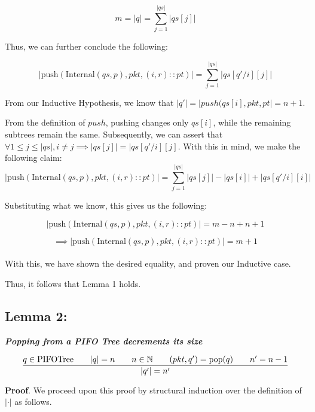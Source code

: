 \documentclass{article}
\begin{document}
$$m = |q| = \sum_{j=1}^{|qs|} |qs[j]|$$

\noindent Thus, we can further conclude the following:

$$|\text{push}(\text{Internal}(qs, p), pkt, (i, r) :: pt)| = \sum_{j=1}^{|qs|} |qs[q'/i][j]|$$

\noindent From our Inductive Hypothesis, we know that $|q'| = |push(qs[i], pkt, pt| = n+1$.\newline

\noindent From the definition of $push$, pushing changes only $qs[i]$, while the remaining subtrees remain the same. Subsequently, we can assert that $\forall 
1 \leq j \leq |qs|, i \neq j \implies |qs[j]| = |qs[q'/i][j]$. With this in mind, we make the following claim:\\[-15pt]

$$|\text{push}(\text{Internal}(qs, p), pkt, (i, r) :: pt)| = \sum_{j=1}^{|qs|} |qs[j]| - |qs[i]| + |qs[q'/i][i]|$$

\noindent Substituting what we know, this gives us the following:

$$|\text{push}(\text{Internal}(qs, p), pkt, (i, r) :: pt)| = m - n + n + 1$$

$$\implies |\text{push}(\text{Internal}(qs, p), pkt, (i, r) :: pt)| = m + 1$$\\[-15pt]

\noindent With this, we have shown the desired equality, and proven our Inductive case.\newline

\noindent Thus, it follows that Lemma 1 holds.\newline

\subsection{Lemma 2:}

\noindent \textbf{\textit{Popping from a PIFO Tree decrements its size}}

$$\frac{q \in \text{PIFOTree} \hspace{0.7cm} |q| = n \hspace{0.7cm} n \in \mathbb{N} \hspace{0.7cm} (pkt, q') = \text{pop}(q) \hspace{0.7cm} n' = n-1}{|q'| = n'}$$

\noindent \textbf{Proof}. We proceed upon this proof by structural induction over the definition of $|\cdot|$ as follows.\newline
\end{document}
